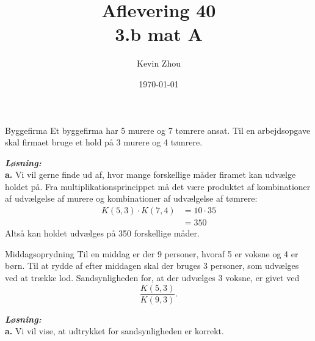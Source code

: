 \documentclass{article}
\title{Aflevering 40\\
{\Large \textbf{3.b mat A}}}
\author{Kevin Zhou}
\date{\today}
\newcommand{\sol}{\setlength{\parindent}{0cm}\textbf{\textit{Løsning:}}\setlength{\parindent}{1cm}}
\begin{document}
\maketitle
\newpage
\begin{question}{Byggefirma}{}
  Et byggefirma har 5 murere og 7 tømrere ansat.
  Til en arbejdsopgave skal firmaet bruge et hold på 3 murere og 4 tømrere.
\end{question}
\sol \\
\textbf{a.}
Vi vil gerne finde ud af, hvor mange forskellige måder firamet kan udvælge holdet på.
Fra multiplikationsprincippet må det være produktet af kombinationer af udvælgelse af murere og kombinationer af udvælgelse af tømrere:
\begin{equation*}
\begin{split}
  K(5,3) \cdot K(7,4) &=10 \cdot 35 \\
  &=350
\end{split}
\end{equation*}
Altså kan holdet udvælges på 350 forskellige måder.
\begin{question}{Middagsoprydning}{}
  Til en middag er der 9 personer, hvoraf 5 er voksne og 4 er børn. Til at rydde af efter
middagen skal der bruges 3 personer, som udvælges ved at trække lod.
Sandsynligheden for, at der udvælges 3 voksne, er givet ved
$$\frac{K(5,3)}{K(9,3)}.$$
\end{question}
\sol \\
\textbf{a.}
Vi vil vise, at udtrykket for sandsynligheden er korrekt.
\end{document}
